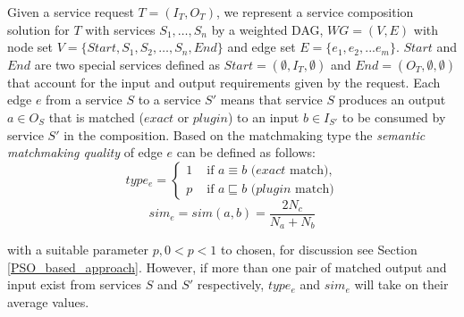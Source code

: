 \documentclass{llncs}
\begin{document}

Given a service request $T=(I_T,O_T)$, we represent a service composition solution for $T$ with services $S_1,\ldots,S_n$  by a weighted DAG, $WG=(V,E)$ with node set $V=\{Start, S_1, S_2, \ldots, S_n, End\}$ and edge set $E = \{e_{1}, e_{2},... e_{m} \}$. $Start$ and $End$ are two special services defined as $Start = (\emptyset, I_T, \emptyset )$ and $End  = (O_T, \emptyset, \emptyset)$ that account for the input and output requirements given by the request. 
Each edge $e$ from a service $S$ to a service $S'$ means that service $S$ produces an output $a\in O_S$ that is matched ($exact$ or $plugin$) to an input $b\in I_{S'}$ to be consumed by service $S'$ in the composition. Based on the matchmaking type the \emph{semantic matchmaking quality} of edge $e$ can be defined as follows:
\vspace{-0.2cm}
\begin{equation}
\label{equation10}
type_e = 
\begin{cases}
	1 & \text{ if $a\equiv b$ ($exact$ match)},\\
	p & \text{ if $a \sqsubseteq b$ ($plugin$ match)}
\end{cases}
\end{equation}
\begin{equation}
\label{equation11}
sim_e = sim(a,b) = \frac{2N_c}{N_{a}+N_{b}}
\end{equation}

\noindent with a suitable parameter $p, 0<p< 1$ to chosen, for discussion see Section \ref{PSO_based_approach}. However, if more than one pair of matched output and input exist from services $S$ and $S'$ respectively, $type_e$ and $sim_e$ will take on their average values.


\end{document}
